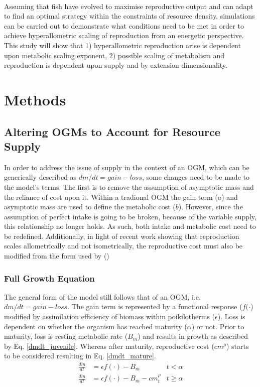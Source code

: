 \documentclass[a4paper, 11pt, hidelinks]{article} %
\begin{document}
	\\
	Assuming that fish have evolved to maximise reproductive output and can adapt to find an optimal strategy within the constraints of resource density, simulations can be carried out to demonstrate what conditions need to be met in order to achieve hyperallometric scaling of reproduction from an energetic perspective.  This study will show that 1) hyperallometric reproduction arise is dependent upon metabolic scaling exponent, %
	2) possible scaling of metabolism and reproduction is dependent upon supply and by extension dimensionality.

	\nolinenumbers
	
\section{Methods}
	\linenumbers
	
	\subsection{Altering OGMs to Account for Resource Supply}
	In order to address the issue of supply in the context of an OGM, which can be generically described as $dm/dt = gain - loss$, some changes need to be made to the model's terms.  The first is to remove the assumption of asymptotic mass and the reliance of cost upon it.  Within a tradional OGM the gain term ($ a $) and asymptotic mass are used to define the metabolic cost ($ b $).  However, since the assumption of perfect intake is going to be broken, because of the variable supply, this relationship no longer holds.  As such, both intake and metabolic cost need to be redefined.  Additionally, in light of recent work showing that reproduction scales allometrically and not isometrically, the reproductive cost must also be modified from the form used by \citeauthor{Charnov2001} (\citeyear{Charnov2001}) \parencite{Marshall2019, Barneche2018} 
	
	\subsubsection{Full Growth Equation}
	The general form of the model still follows that of an OGM, i.e. $dm/dt = gain - loss$.  The gain term is represented by a functional response ($ f(\cdot $) modified by assimilation efficiency of biomass within poikilotherms ($ \epsilon $).  Loss is dependent on whether the organism has reached maturity ($ \alpha $) or not.  Prior to maturity, loss is resting metabolic rate ($ B_m $) and results in growth as described by Eq. \ref{dmdt_juvenile}.  Whereas after maturity, reproductive cost ($ cm^\rho $) starts to be considered resulting in Eq. \ref{dmdt_mature}.
	\begin{align}
	\label{dmdt_juvenile}
	\frac{dm}{dt} &= \epsilon f(\cdot) - B_m & t < \alpha \\
	\label{dmdt_mature}
	\frac{dm}{dt} &= \epsilon f(\cdot) - B_m - cm_t^\rho & t \geq \alpha
	\end{align}
	
\end{document}
